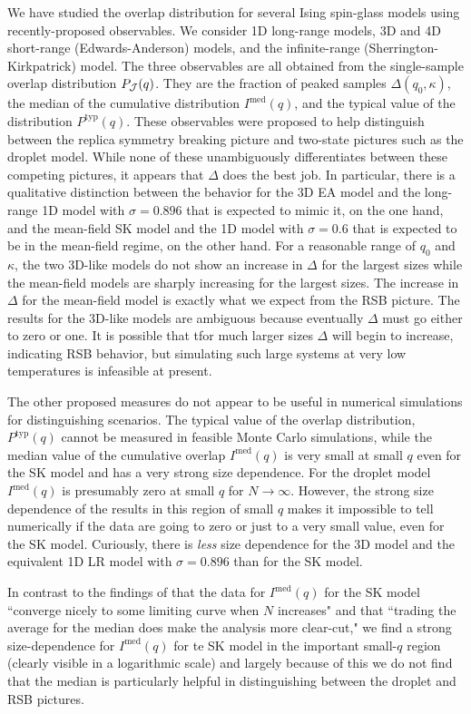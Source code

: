 We have studied the overlap distribution for several Ising spin-glass models
using recently-proposed observables. We consider 1D long-range models, 3D and
4D short-range (Edwards-Anderson) models, and the infinite-range
(Sherrington-Kirkpatrick) model. The three observables are all obtained from
the single-sample overlap distribution $P_{\mathcal{J}}(q)$. They are the fraction
of peaked samples $\Delta(q_0,\kappa)$, the median of the cumulative
distribution $I^{\mathrm{med}}(q)$, and the typical value of the distribution
$P^{\mathrm{typ}}(q)$. These observables were proposed to help distinguish
between the replica symmetry breaking picture and two-state pictures such as
the droplet model. While none of these unambiguously differentiates between
these competing pictures, it appears that $\Delta$ does the best job. In
particular, there is a qualitative distinction between the behavior for the 3D
EA model and the long-range 1D model with $\sigma=0.896$ that is expected to
mimic it, on the one hand, and the mean-field SK model and the 1D model with
$\sigma=0.6$ that is expected to be in the mean-field regime, on the other
hand. For a reasonable range of $q_0$ and $\kappa$, the two 3D-like models do
not show an increase in $\Delta$ for the largest sizes while the mean-field
models are sharply increasing for the largest sizes. The increase in $\Delta$
for the mean-field model is exactly what we expect from the RSB picture. The
results for the 3D-like models are ambiguous because eventually $\Delta$ must
go either to zero or one. It is possible that tfor much larger sizes $\Delta$
will begin to increase, indicating RSB behavior, but simulating such large systems
at very low temperatures is infeasible at present.

The other proposed measures do not appear to be useful in numerical simulations
for distinguishing scenarios. The typical value of the overlap distribution,
$P^{\mathrm{typ}}(q)$ cannot be measured in feasible Monte Carlo simulations,
while the median value of the cumulative overlap $I^{\mathrm{med}}(q)$ is very
small at small $q$ even for the SK model and has a very strong size dependence.
For the droplet model $I^{\mathrm{med}}(q)$ is presumably zero at small $q$ for
$N \to \infty$. However, the strong size dependence of the results in this
region of small $q$ makes it impossible to tell numerically if the data are
going to zero or just to a very small value, even for the SK model. Curiously,
there is \emph{less} size dependence for the 3D model and the equivalent 1D LR
model with $\sigma=0.896$ than for the SK model.

In contrast to the findings of \textcite{billoire2014cumulative} that the data
for $I^{\mathrm{med}}(q)$ for the SK model ``converge nicely to some limiting
curve when $N$ increases" and that ``trading the average for the median does
make the analysis more clear-cut," we find a strong size-dependence for
$I^{\mathrm{med}}(q)$ for te SK model in the important small-$q$ region
(clearly visible in a logarithmic scale) and largely because of this we do not
find that the median is particularly helpful in distinguishing between the
droplet and RSB pictures.
